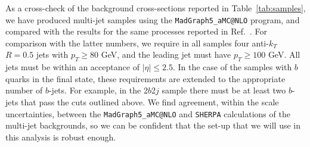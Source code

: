 As a cross-check of the background cross-sections reported in Table~\ref{tab:samples}, we have produced multi-jet samples
using the {\tt MadGraph5\_aMC@NLO} program, and compared with the results for the same processes reported in
Ref.~\cite{Alwall:2014hca}.
%
For comparison with the latter numbers, 
we require in all samples four anti-$k_T$ $R=0.5$ jets with $p_T \ge 80 $ GeV, and the leading jet must have $p_T \ge 100$ GeV.
%
All jets must be within an acceptance of $|\eta| \le 2.5 $.
%
In the case of the samples with $b$ quarks in the final state, these requirements are extended to the appropriate number of $b$-jets. For example, in the 2$b$2$j$ sample there must be at least two $b$-jets that pass the cuts outlined above.
%
We find agreement, within the scale uncertainties, between the {\tt MadGraph5\_aMC@NLO} and {\tt SHERPA} calculations of the multi-jet
backgrounds, so we can be confident that the set-up that we will use in this analysis is robust enough.

